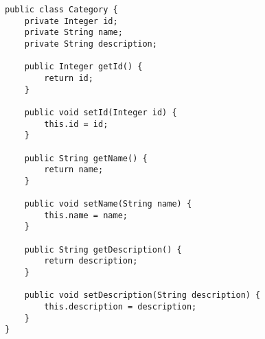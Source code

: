 
\begin{lstlisting}[caption={Príklad objektu získavaného z databáze}, label={code:category}]
public class Category {
    private Integer id;
    private String name;
    private String description;

    public Integer getId() {
        return id;
    }

    public void setId(Integer id) {
        this.id = id;
    }

    public String getName() {
        return name;
    }

    public void setName(String name) {
        this.name = name;
    }

    public String getDescription() {
        return description;
    }

    public void setDescription(String description) {
        this.description = description;
    }
}
\end{lstlisting}
